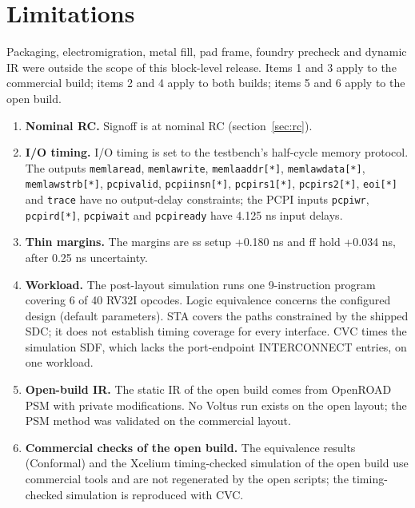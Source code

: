\documentclass[11pt,letterpaper]{article}
\newcommand{\sk}[1]{\texttt{#1}}
\renewcommand{\_}{\textunderscore\penalty0\hskip0pt\relax}
\begin{document}
\section{Limitations}
Packaging, electromigration, metal fill, pad frame, foundry precheck and dynamic IR were outside the scope of this block-level release. Items 1 and 3 apply to the commercial build; items 2 and 4 apply to both builds; items 5 and 6 apply to the open build.
\begin{enumerate}
\item \textbf{Nominal RC.} Signoff is at nominal RC (section~\ref{sec:rc}).
\item \textbf{I/O timing.} I/O timing is set to the testbench's half-cycle memory protocol. The outputs \sk{mem\_la\_read}, \sk{mem\_la\_write}, \sk{mem\_la\_addr[*]}, \sk{mem\_la\_wdata[*]}, \sk{mem\_la\_wstrb[*]}, \sk{pcpi\_valid}, \sk{pcpi\_insn[*]}, \sk{pcpi\_rs1[*]}, \sk{pcpi\_rs2[*]}, \sk{eoi[*]} and \sk{trace\_*} have no output-delay constraints; the PCPI inputs \sk{pcpi\_wr}, \sk{pcpi\_rd[*]}, \sk{pcpi\_wait} and \sk{pcpi\_ready} have 4.125 ns input delays.
\item \textbf{Thin margins.} The margins are ss setup +0.180 ns and ff hold +0.034 ns, after 0.25 ns uncertainty.
\item \textbf{Workload.} The post-layout simulation runs one 9-instruction program covering 6 of 40 RV32I opcodes. Logic equivalence concerns the configured design (default parameters). STA covers the paths constrained by the shipped SDC; it does not establish timing coverage for every interface. CVC times the simulation SDF, which lacks the port-endpoint INTERCONNECT entries, on one workload.
\item \textbf{Open-build IR.} The static IR of the open build comes from OpenROAD PSM with private modifications. No Voltus run exists on the open layout; the PSM method was validated on the commercial layout.
\item \textbf{Commercial checks of the open build.} The equivalence results (Conformal) and the Xcelium timing-checked simulation of the open build use commercial tools and are not regenerated by the open scripts; the timing-checked simulation is reproduced with CVC.
\end{enumerate}
\end{document}
